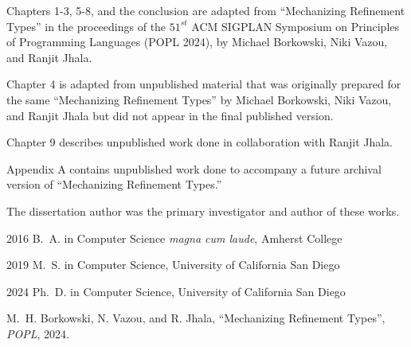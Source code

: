 \begin{frontmatter}
\begin{acknowledgements}
    Chapters 1-3, 5-8, and the conclusion are adapted from 
    ``Mechanizing Refinement Types'' in the proceedings of the 
    $51^{st}$ ACM SIGPLAN Symposium on Principles of Programming
    Languages (POPL 2024), by Michael Borkowski, Niki Vazou, and
    Ranjit Jhala.
    
    Chapter 4 is adapted from unpublished material that was originally
    prepared for the same  ``Mechanizing Refinement Types''
    by Michael Borkowski, Niki Vazou, and Ranjit Jhala but did not 
    appear in the final published version.

    Chapter 9 describes unpublished work done in collaboration with Ranjit Jhala.

    Appendix A contains unpublished work done to accompany a
    future archival version of ``Mechanizing Refinement Types.''

    The dissertation author was the primary investigator and author of these works.


\end{acknowledgements}


%
%
\begin{vitapage}
\begin{vita}
  \item[2016] B.~A. in Computer Science \emph{magna cum laude}, Amherst College
  \item[2019] M.~S. in Computer Science, University of California San Diego
  \item[2024] Ph.~D. in Computer Science, University of California San Diego
\end{vita}
\begin{publications}
  \item M.~H. Borkowski, N. Vazou, and R. Jhala, ``Mechanizing Refinement Types'', \emph{POPL}, 2024.
\end{publications}
\end{vitapage}



\end{frontmatter}
